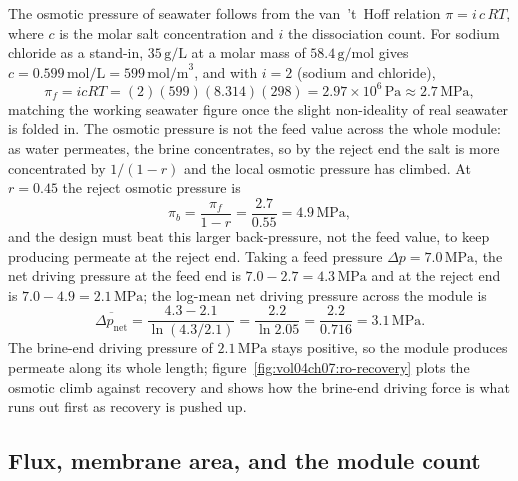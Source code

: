 The osmotic pressure of seawater follows from the van~'t~Hoff relation
$\pi = i\,c\,RT$, where $c$ is the molar salt concentration and $i$ the
dissociation count. For sodium chloride as a stand-in, $35\,\text{g/L}$
at a molar mass of $58.4\,\text{g/mol}$ gives $c = 0.599\,\text{mol/L} =
599\,\text{mol/m}^3$, and with $i = 2$ (sodium and chloride),
\[
\pi_f = i c R T = (2)(599)(8.314)(298) = 2.97\times 10^{6}\,\text{Pa}
\approx 2.7\,\text{MPa},
\]
matching the working seawater figure once the slight non-ideality of real
seawater is folded in. The osmotic pressure is not the feed value across
the whole module: as water permeates, the brine concentrates, so by the
reject end the salt is more concentrated by $1/(1-r)$ and the local
osmotic pressure has climbed. At $r = 0.45$ the reject osmotic pressure is
\[
\pi_b = \frac{\pi_f}{1-r} = \frac{2.7}{0.55} = 4.9\,\text{MPa},
\]
and the design must beat this larger back-pressure, not the feed value,
to keep producing permeate at the reject end. Taking a feed pressure
$\Delta p = 7.0\,\text{MPa}$, the net driving pressure at the feed end is
$7.0 - 2.7 = 4.3\,\text{MPa}$ and at the reject end is $7.0 - 4.9 =
2.1\,\text{MPa}$; the log-mean net driving pressure across the module is
\[
\overline{\Delta p_{\text{net}}} = \frac{4.3 - 2.1}{\ln(4.3/2.1)} =
\frac{2.2}{\ln 2.05} = \frac{2.2}{0.716} = 3.1\,\text{MPa}.
\]
The brine-end driving pressure of $2.1\,\text{MPa}$ stays positive, so
the module produces permeate along its whole length;
figure~\ref{fig:vol04ch07:ro-recovery} plots the osmotic climb against
recovery and shows how the brine-end driving force is what runs out
first as recovery is pushed up.



\subsection{Flux, membrane area, and the module count}

